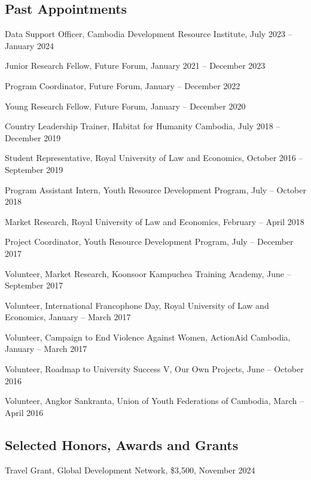 \documentclass[10pt,a4paper]{article}
\begin{document}
\subsection*{Past Appointments}

	Data Support Officer, Cambodia Development Resource Institute, July 2023 -- January 2024

	Junior Research Fellow, Future Forum, January 2021 -- December 2023
	
	Program Coordinator, Future Forum, January -- December 2022
	
	Young Research Fellow, Future Forum, January -- December 2020

	Country Leadership Trainer, Habitat for Humanity Cambodia, July 2018 -- December 2019
	
	Student Representative, Royal University of Law and Economics, October 2016 -- September 2019
	
	Program Assistant Intern, Youth Resource Development Program, July -- October 2018
	
	Market Research, Royal University of Law and Economics, February -- April 2018
	
	Project Coordinator, Youth Resource Development Program, July -- December 2017
	
	Volunteer, Market Research, Koonsoor Kampuchea Training Academy, June -- September 2017
	
	Volunteer, International Francophone Day,  Royal University of Law and Economics, January -- March 2017
	
	Volunteer, Campaign to End Violence Against Women, ActionAid Cambodia, January -- March 2017
	
	Volunteer, Roadmap to University Success V, Our Own Projects, June -- October 2016
	
	Volunteer, Angkor Sankranta, Union of Youth Federations of Cambodia, March -- April 2016

\subsection*{Selected Honors, Awards and Grants}

\parindent=0pt
	
	Travel Grant, Global Development Network, \$3,500, November 2024
	
\end{document}
